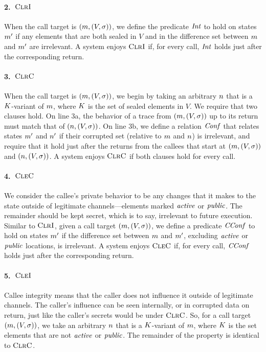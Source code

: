 \documentclass[10pt,conference]{ieeetran}%
\theoremstyle{definition}
\begin{document}
\paragraph*{2.~\(\textnormal{\sc ClrI}\)}
When the call target is \((m,(V,\sigma))\), we define the predicate \(\mathit{Int}\) to hold
on states \(m'\) if any elements that are both sealed in \(V\) and in the difference
set between \(m\) and \(m'\) are irrelevant. A system enjoys \(\textnormal{\sc ClrI}\) if, for every
call, \(\mathit{Int}\) holds just after the corresponding return.

\paragraph*{3.~\(\textnormal{\sc ClrC}\)}
When the call target is \((m,(V,\sigma))\), we begin by taking an arbitrary \(n\)
that is a \(K\)-variant of \(m\), where \(K\) is the set of sealed elements
in \(V\). We require that two clauses hold. On line 3a, the behavior of a trace from
\((m,(V,\sigma))\) up to its return must match that of \((n,(V,\sigma))\).
On line 3b, we define a relation \(\mathit{Conf}\) that relates states \(m'\) and \(n'\)
if their corrupted set (relative to \(m\) and \(n\)) is irrelevant, and require
that it hold just after the returns from the callees that start at \((m,(V,\sigma))\) and \((n,(V,\sigma))\).
A system enjoys \(\textnormal{\sc ClrC}\) if both clauses hold for every call.

\paragraph*{4.~\(\textnormal{\sc CleC}\)}
We consider the callee's private behavior to be any changes that it makes to the state
outside of legitimate channels---elements marked \(\mathit{active}\) or \(\mathit{public}\). The remainder
should be kept secret, which is to say, irrelevant to future execution. Similar to \(\textnormal{\sc ClrI}\), given a call target
\((m,(V,\sigma))\), we define a predicate \(\mathit{CConf}\) to hold
on states \(m'\) if the difference set between \(m\) and \(m'\), excluding
\(\mathit{active}\) or \(\mathit{public}\) locations, is irrelevant.
A system enjoys \(\textnormal{\sc CleC}\) if, for every call, \(\mathit{CConf}\) holds just after the corresponding return.

\paragraph*{5.~\(\textnormal{\sc CleI}\)}
Callee integrity means that the caller does not influence it outside of legitimate
channels. The caller's influence can be seen internally, or in corrupted data on return,
just like the caller's secrets would be under \(\textnormal{\sc ClrC}\). So, for a call target
\((m,(V,\sigma))\), we take an arbitrary \(n\) that is a \(K\)-variant
of \(m\), where \(K\) is the set elements that are not \(\mathit{active}\)
or \(\mathit{public}\). The remainder of the property is identical to \(\textnormal{\sc ClrC}\).
\end{document}

